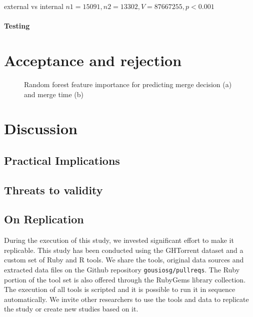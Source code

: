 \documentclass{sig-alternate}
\begin{document}
external vs internal $n1 = 15091, n2 = 13302, V = 87667255, p < 0.001$



\paragraph*{Testing}

\section{Acceptance and rejection}
\label{sec:accrej}




\begin{figure*}
\centering
{}
\caption{Random forest feature importance for predicting merge decision (a) and merge time (b)}
\end{figure*}


\section{Discussion}
\label{sec:discussion}

\subsection{Practical Implications}

\subsection{Threats to validity}

\subsection{On Replication}

During the execution of this study, we invested significant effort to
make it replicable.  This study has been conducted using the GHTorrent dataset
and a custom set of Ruby and R tools. We share the tools, original data sources
and extracted data files on the Github repository \texttt{gousiosg/pullreqs}.
The Ruby portion of the tool set is also offered through the RubyGems library
collection. The execution of all tools is scripted and it is possible to run it
in sequence automatically. We invite other researchers to use the tools and data
to replicate the study or create new studies based on it.
\end{document}
